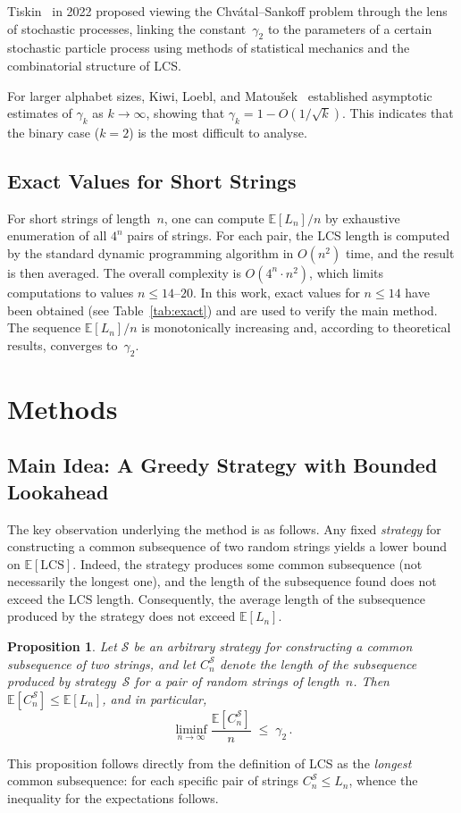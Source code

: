 \documentclass[12pt,a4paper]{article}
\newtheorem{proposition}{Proposition}
\begin{document}
Tiskin~\cite{tiskin2022} in 2022 proposed viewing the Chv\'{a}tal--Sankoff problem through the lens of stochastic processes, linking the constant~$\gamma_2$ to the parameters of a certain stochastic particle process using methods of statistical mechanics and the combinatorial structure of LCS.

For larger alphabet sizes, Kiwi, Loebl, and Matou\v{s}ek~\cite{kiwi2005} established asymptotic estimates of $\gamma_k$ as $k \to \infty$, showing that $\gamma_k = 1 - O(1/\sqrt{k})$.
This indicates that the binary case ($k = 2$) is the most difficult to analyse.

\subsection{Exact Values for Short Strings}
For short strings of length~$n$, one can compute $\mathbb{E}[L_n]/n$ by exhaustive enumeration of all $4^n$ pairs of strings.
For each pair, the LCS length is computed by the standard dynamic programming algorithm in $O(n^2)$ time, and the result is then averaged.
The overall complexity is $O(4^n \cdot n^2)$, which limits computations to values $n \leq 14$--$20$.
In this work, exact values for $n \leq 14$ have been obtained (see Table~\ref{tab:exact}) and are used to verify the main method.
The sequence $\mathbb{E}[L_n]/n$ is monotonically increasing and, according to theoretical results, converges to~$\gamma_2$.
\section{Methods}
\subsection{Main Idea: A Greedy Strategy with Bounded Lookahead}
The key observation underlying the method is as follows.
Any fixed \emph{strategy} for constructing a common subsequence of two random strings yields a lower bound on $\mathbb{E}[\mathrm{LCS}]$.
Indeed, the strategy produces some common subsequence (not necessarily the longest one), and the length of the subsequence found does not exceed the LCS length.
Consequently, the average length of the subsequence produced by the strategy does not exceed $\mathbb{E}[L_n]$.
\begin{proposition}
Let $\mathcal{S}$ be an arbitrary strategy for constructing a common subsequence of two strings, and let $C_n^{\mathcal{S}}$ denote the length of the subsequence produced by strategy~$\mathcal{S}$ for a pair of random strings of length~$n$.
Then $\mathbb{E}[C_n^{\mathcal{S}}] \leq \mathbb{E}[L_n]$, and in particular,
\[
  \liminf_{n \to \infty} \frac{\mathbb{E}[C_n^{\mathcal{S}}]}{n} \;\leq\; \gamma_2\,.
\]
\end{proposition}
This proposition follows directly from the definition of LCS as the \emph{longest} common subsequence: for each specific pair of strings $C_n^{\mathcal{S}} \leq L_n$, whence the inequality for the expectations follows.
\end{document}
